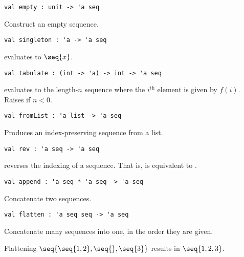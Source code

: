 \begin{gram}[empty]
\label{gr:empty}
\begin{verbatim}
val empty : unit -> 'a seq
\end{verbatim}
Construct an empty sequence.
\end{gram}

\begin{gram}[singleton]
\label{gr:singleton}
\begin{verbatim}
val singleton : 'a -> 'a seq
\end{verbatim}
 evaluates to $\seq{x}$.
\end{gram}

\begin{gram}[tabulate]
\label{gr:tabulate}
\begin{verbatim}
val tabulate : (int -> 'a) -> int -> 'a seq
\end{verbatim}
 evaluates to the length-$n$ sequence where the $i^\text{th}$
element is given by $f(i)$. Raises  if $n < 0$.
\end{gram}

\begin{gram}[fromList]
\label{gr:fromList}
\begin{verbatim}
val fromList : 'a list -> 'a seq
\end{verbatim}
Produces an index-preserving sequence from a list.
\end{gram}

\begin{gram}[rev]
\label{gr:rev}
\begin{verbatim}
val rev : 'a seq -> 'a seq
\end{verbatim}
 reverses the indexing of a sequence. That is, 
is equivalent to .
\end{gram}

\begin{gram}[append]
\label{gr:append}
\begin{verbatim}
val append : 'a seq * 'a seq -> 'a seq
\end{verbatim}
Concatenate two sequences.
\end{gram}

\begin{group}
\begin{gram}[flatten]
\label{gr:flatten}
\begin{verbatim}
val flatten : 'a seq seq -> 'a seq
\end{verbatim}
Concatenate many sequences into one, in the order they are given.
\end{gram}
\begin{example}
Flattening $\seq{\seq{1,2},\seq{},\seq{3}}$ results in $\seq{1,2,3}$.
\end{example}
\end{group}

